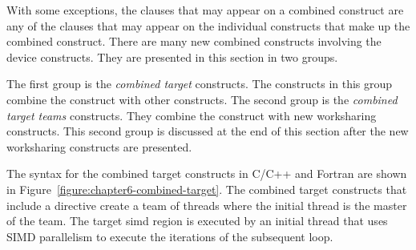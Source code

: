 With some exceptions, the clauses that may appear on a combined
construct are any of the clauses that may appear on the individual
constructs that make up the combined construct.
There are many new combined
constructs involving the device constructs.  They are presented
in this section in two groups.  

The first group is the \emph{combined target} constructs.  The constructs in
this group combine the  construct with other constructs.
The second group is the \emph{combined target teams} constructs.  
They combine the  construct with new
worksharing constructs.  This second group is discussed at the end of this section
after the new worksharing constructs are presented.

The syntax for the combined target constructs in C/C++ and Fortran
are shown in Figure~\ref{figure:chapter6-combined-target}.  The combined
target constructs that include a  directive create a
team of threads where the initial thread is the master of the team.
The target simd region is executed by an initial thread that uses SIMD
parallelism to execute the iterations of the subsequent loop.

